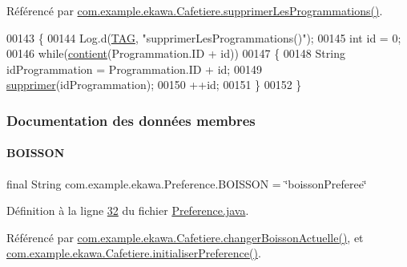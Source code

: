 Référencé par \hyperlink{_cafetiere_8java_source_l00834}{com.\+example.\+ekawa.\+Cafetiere.\+supprimer\+Les\+Programmations()}.


\begin{DoxyCode}
00143     \{
00144         Log.d(\hyperlink{classcom_1_1example_1_1ekawa_1_1_preference_aeb5e1e787153c37929839622ac5d0339}{TAG}, \textcolor{stringliteral}{"supprimerLesProgrammations()"});
00145         \textcolor{keywordtype}{int} \textcolor{keywordtype}{id} = 0;
00146         \textcolor{keywordflow}{while}(\hyperlink{classcom_1_1example_1_1ekawa_1_1_preference_a25b7a4cfcc9fe5f9258471ce454a718a}{contient}(Programmation.ID + \textcolor{keywordtype}{id}))
00147         \{
00148             String idProgrammation = Programmation.ID + id;
00149             \hyperlink{classcom_1_1example_1_1ekawa_1_1_preference_a63914421a8e7b8f79822853e3aff3106}{supprimer}(idProgrammation);
00150             ++id;
00151         \}
00152     \}
\end{DoxyCode}


\subsubsection{Documentation des données membres}
\mbox{\label{classcom_1_1example_1_1ekawa_1_1_preference_a6923224bd12c5b50259e5f376ed58a35}} 
\paragraph{\texorpdfstring{B\+O\+I\+S\+S\+ON}{BOISSON}}
{\footnotesize\ttfamily final String com.\+example.\+ekawa.\+Preference.\+B\+O\+I\+S\+S\+ON = \char`\"{}boisson\+Preferee\char`\"{}\hspace{0.3cm}{\ttfamily [static]}}



Définition à la ligne \hyperlink{_preference_8java_source_l00032}{32} du fichier \hyperlink{_preference_8java_source}{Preference.\+java}.



Référencé par \hyperlink{_cafetiere_8java_source_l00224}{com.\+example.\+ekawa.\+Cafetiere.\+changer\+Boisson\+Actuelle()}, et \hyperlink{_cafetiere_8java_source_l00122}{com.\+example.\+ekawa.\+Cafetiere.\+initialiser\+Preference()}.


